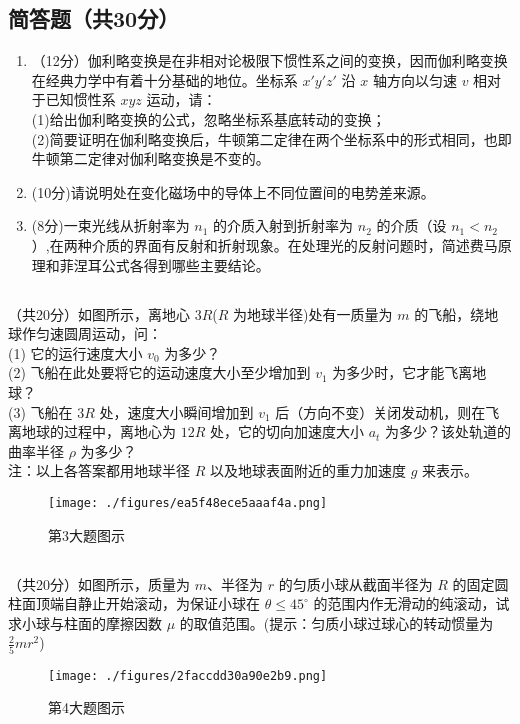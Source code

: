 \subsection{简答题（共30分）}
\begin{enumerate}
\item （12分）伽利略变换是在非相对论极限下惯性系之间的变换，因而伽利略变换在经典力学中有着十分基础的地位。坐标系 $x'y'z'$ 沿 $x$ 轴方向以匀速 $v$ 相对于已知惯性系 $xyz$ 运动，请：\\
(1)给出伽利略变换的公式，忽略坐标系基底转动的变换；\\
(2)简要证明在伽利略变换后，牛顿第二定律在两个坐标系中的形式相同，也即牛顿第二定律对伽利略变换是不变的。\\

\item (10分)请说明处在变化磁场中的导体上不同位置间的电势差来源。

\item (8分)一束光线从折射率为 $n_{1}$ 的介质入射到折射率为 $n_{2}$ 的介质（设 $n_{1}<n_{2}$）,在两种介质的界面有反射和折射现象。在处理光的反射问题时，简述费马原理和菲涅耳公式各得到哪些主要结论。
\end{enumerate}
\subsection{ }
（共20分）如图所示，离地心 $3R$($R$ 为地球半径)处有一质量为 $m$ 的飞船，绕地球作匀速圆周运动，问：\\
(1) 它的运行速度大小 $v_{0}$ 为多少？\\
(2) 飞船在此处要将它的运动速度大小至少增加到 $v_{1}$ 为多少时，它才能飞离地球？\\
(3) 飞船在 $3R$ 处，速度大小瞬间增加到 $v_{1}$ 后（方向不变）关闭发动机，则在飞离地球的过程中，离地心为 $12R$ 处，它的切向加速度大小 $a_{t}$ 为多少？该处轨道的曲率半径 $\rho$ 为多少？\\
注：以上各答案都用地球半径 $R$ 以及地球表面附近的重力加速度 $g$ 来表示。\\
\begin{figure}[ht]
\centering
\texttt{[image: ./figures/ea5f48ece5aaaf4a.png]}
\caption{第3大题图示} \label{fig_CAS20_1}
\end{figure}

\subsection{ }
（共20分）如图所示，质量为 $m$、半径为 $r$ 的匀质小球从截面半径为 $R$ 的固定圆柱面顶端自静止开始滚动，为保证小球在 $\theta \le 45^{\circ}$ 的范围内作无滑动的纯滚动，试求小球与柱面的摩擦因数 $\mu$ 的取值范围。(提示：匀质小球过球心的转动惯量为 $\frac{2}{5} mr^{2}$)\\
\begin{figure}[ht]
\centering
\texttt{[image: ./figures/2faccdd30a90e2b9.png]}
\caption{第4大题图示} \label{fig_CAS20_2}
\end{figure}

